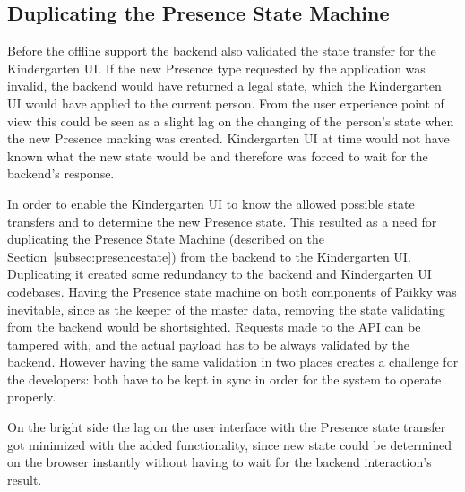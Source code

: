 \subsection{Duplicating the Presence State Machine}

Before the offline support the backend also validated the state transfer for the Kindergarten UI. If the new Presence type requested by the application was invalid, the backend would have returned a legal state, which the Kindergarten UI would have applied to the current person. From the user experience point of view this could be seen as a slight lag on the changing of the person's state when the new Presence marking was created. Kindergarten UI at time would not have known what the new state would be and therefore was forced to wait for the backend's response. 


In order to enable the Kindergarten UI to know the allowed possible state transfers and to determine the new Presence state. This resulted as a need for duplicating the Presence State Machine (described on the Section~\ref{subsec:presencestate}) from the backend to the Kindergarten UI. Duplicating it created some redundancy to the backend and Kindergarten UI codebases. Having the Presence state machine on both components of Päikky was inevitable, since as the keeper of the master data, removing the state validating from the backend would be shortsighted. Requests made to the API can be tampered with, and the actual payload has to be always validated by the backend. However having the same validation in two places creates a challenge for the developers: both have to be kept in sync in order for the system to operate properly. 

On the bright side the lag on the user interface with the Presence state transfer got minimized with the added functionality, since new state could be determined on the browser instantly without having to wait for the backend interaction's result.




















